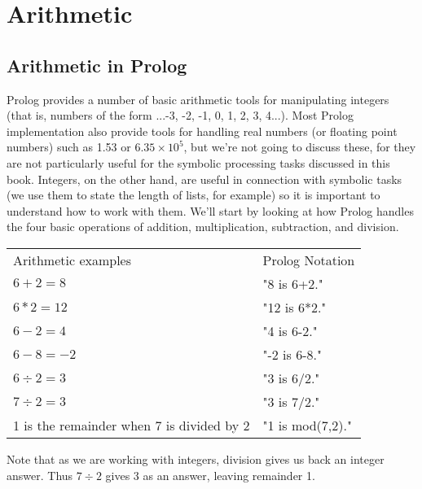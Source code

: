 
\chapter{Arithmetic}\label{CHAPTER5}


\section{Arithmetic in Prolog}\label{SEC.L5.ARITHMETIC}



Prolog provides a number of basic arithmetic tools for manipulating
integers (that is, numbers of the form ...-3, -2, -1, 0, 1, 2, 3,
4...).  Most Prolog implementation also provide tools for handling
real numbers (or floating point numbers) such as 1.53 or $6.35\times
10^{5}$, but we're not going to discuss these, for they are not
particularly useful for the symbolic processing tasks discussed in
this book.  Integers, on the other hand, are useful in connection with
symbolic tasks (we use them to state the length of lists, for example)
so it is important to understand how to work with them.  We'll start
by looking at how Prolog handles the four basic operations of
addition, multiplication, subtraction, and division.

\begin{center}\begin{tabular}{ll}
Arithmetic examples & Prolog Notation\\
$6+2=8$&"8 is 6+2."\\
$6*2=12$&"12 is 6*2."\\
$6-2=4$&"4 is 6-2."\\
$6-8=-2$&"-2 is 6-8."\\
$6\div 2=3$&"3 is 6/2."\\
$7\div 2=3$&"3 is 7/2."\\
1 is the remainder when 7 is divided by 2&"1 is mod(7,2)."
\end{tabular}\end{center}
Note that as we are working with integers, division gives us back an
integer answer.  Thus $7\div 2$ gives 3 as an answer,  leaving
remainder 1.

